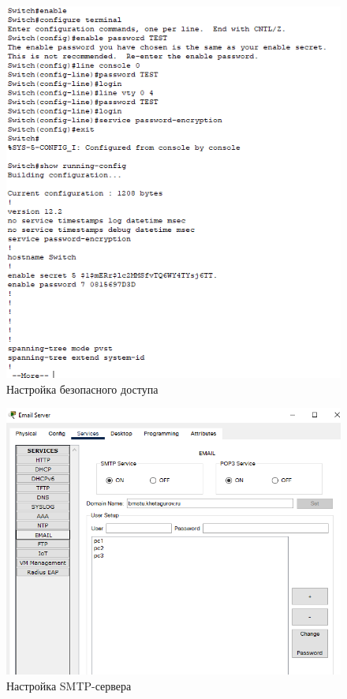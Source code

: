 \documentclass[12pt, a4paper]{extarticle}
\begin{document}
\begin{figure}[H]
	\centering
	\includegraphics[scale=0.7]{images/sec.png}
	\caption{Настройка безопасного доступа}
\end{figure}

\begin{figure}[H]
	\centering
	\includegraphics[scale=0.7]{images/smtp.png}
	\caption{Настройка SMTP-сервера}
\end{figure}
\end{document}
